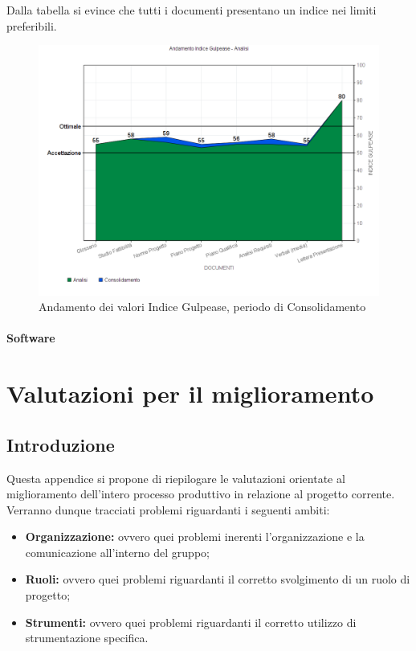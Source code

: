 \documentclass[openany,12pt,a4paper]{report}
\begin{document}
\begin{itemize}
	Dalla tabella si evince che tutti i documenti presentano un indice nei limiti preferibili.
	
	\begin{figure}[H]
		\includegraphics[scale=0.5]{verifica-consolidamento-gulpease}
		\centering
		\caption{Andamento dei valori Indice Gulpease, periodo di Consolidamento}
	\end{figure}	
\end{itemize}

\subsubsection{Software}

\chapter{Valutazioni per il miglioramento}

\section{Introduzione}

Questa appendice si propone di riepilogare le valutazioni orientate al miglioramento dell'intero processo produttivo in relazione al progetto corrente. Verranno dunque tracciati problemi riguardanti i seguenti ambiti:

\begin{itemize}
	\item \textbf{Organizzazione:} ovvero quei problemi inerenti l'organizzazione e la comunicazione all'interno del gruppo;
	\item \textbf{Ruoli:} ovvero quei problemi riguardanti il corretto svolgimento di un ruolo di progetto;
	\item \textbf{Strumenti:} ovvero quei problemi riguardanti il corretto utilizzo di strumentazione specifica.
\end{itemize}
\end{document}
